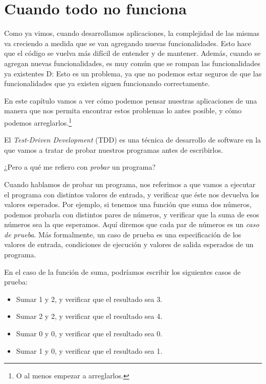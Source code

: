 \chapter{Cuando todo no funciona}
  \label{chap:cuando-todo-no-funciona}

  Como ya vimos, cuando desarrollamos aplicaciones, la complejidad de las mismas va creciendo a 
  medida que se van agregando nuevas funcionalidades. 
  Esto hace que el código se vuelva más difícil de entender y de mantener. 
  Además, cuando se agregan nuevas funcionalidades, es muy común que se rompan las funcionalidades 
  ya existentes D: 
  Esto es un problema, ya que no podemos estar seguros de que las funcionalidades que ya existen 
  siguen funcionando correctamente.

  En este capítulo vamos a ver cómo podemos pensar nuestras aplicaciones de una manera que nos
  permita encontrar estos problemas lo antes posible, y cómo podemos arreglarlos.\footnote{
    O al menos empezar a arreglarlos.
  }

  El \textit{Test-Driven Development} (TDD) es una técnica de 
  desarrollo de software en la que vamos a tratar de probar nuestros programas antes de escribirlos.
  
  ¿Pero a qué me refiero con \textit{probar} un programa?

  Cuando hablamos de probar un programa, nos referimos a que vamos a ejecutar el programa con
  distintos valores de entrada, y verificar que éste nos devuelva los valores esperados.
  Por ejemplo, si tenemos una función que suma dos números, podemos probarla con distintos pares
  de números, y verificar que la suma de esos números sea la que esperamos.
  Aquí diremos que cada par de números es un \textit{caso de prueba}.
  Más formalmente, un caso de prueba es una especificación de los valores de entrada, condiciones de
  ejecución y valores de salida esperados de un programa.

  En el caso de la función de suma, podríamos escribir los siguientes casos de prueba:

  \begin{itemize}
    \item Sumar 1 y 2, y verificar que el resultado sea 3.
    \item Sumar 2 y 2, y verificar que el resultado sea 4.
    \item Sumar 0 y 0, y verificar que el resultado sea 0.
    \item Sumar 1 y 0, y verificar que el resultado sea 1.
  \end{itemize}

